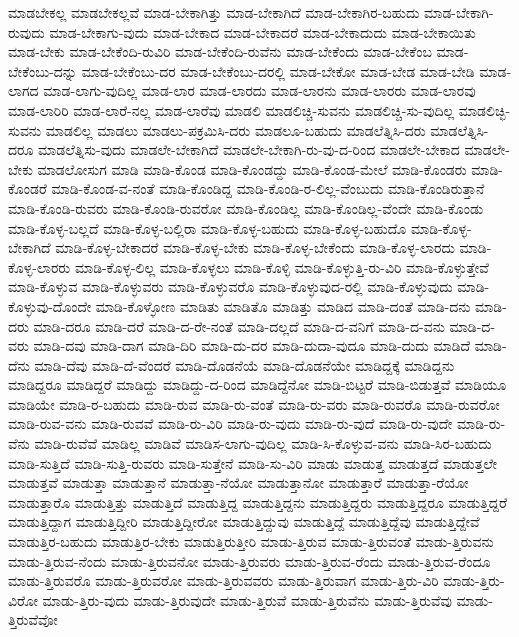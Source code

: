 {ಮಾಡಬೇಕಲ್ಲ
ಮಾಡಬೇಕಲ್ಲವೆ
ಮಾಡ-ಬೇಕಾಗಿತ್ತು
ಮಾಡ-ಬೇಕಾಗಿದೆ
ಮಾಡ-ಬೇಕಾಗಿರ-ಬಹುದು
ಮಾಡ-ಬೇಕಾಗಿ-ರುವುದು
ಮಾಡ-ಬೇಕಾಗು-ವುದು
ಮಾಡ-ಬೇಕಾದ
ಮಾಡ-ಬೇಕಾದರೆ
ಮಾಡ-ಬೇಕಾದುದು
ಮಾಡ-ಬೇಕಾಯಿತು
ಮಾಡ-ಬೇಕು
ಮಾಡ-ಬೇಕೆಂದಿ-ರುವಿರಿ
ಮಾಡ-ಬೇಕೆಂದಿ-ರುವೆನು
ಮಾಡ-ಬೇಕೆಂದು
ಮಾಡ-ಬೇಕೆಂಬ
ಮಾಡ-ಬೇಕೆಂಬು-ದನ್ನು
ಮಾಡ-ಬೇಕೆಂಬು-ದರ
ಮಾಡ-ಬೇಕೆಂಬು-ದರಲ್ಲಿ
ಮಾಡ-ಬೇಕೋ
ಮಾಡ-ಬೇಡ
ಮಾಡ-ಬೇಡಿ
ಮಾಡ-ಲಾಗದ
ಮಾಡ-ಲಾಗು-ವುದಿಲ್ಲ
ಮಾಡ-ಲಾರ
ಮಾಡ-ಲಾರದು
ಮಾಡ-ಲಾರನು
ಮಾಡ-ಲಾರರು
ಮಾಡ-ಲಾರವು
ಮಾಡ-ಲಾರಿರಿ
ಮಾಡ-ಲಾರೆ-ನಲ್ಲ
ಮಾಡ-ಲಾರೆವು
ಮಾಡಲಿ
ಮಾಡಲಿಚ್ಚಿ-ಸುವನು
ಮಾಡಲಿಚ್ಚಿ-ಸು-ವುದಿಲ್ಲ
ಮಾಡಲಿಚ್ಛಿ-ಸುವನು
ಮಾಡಲಿಲ್ಲ
ಮಾಡಲು
ಮಾಡಲು-ಪಕ್ರಮಿಸಿ-ದರು
ಮಾಡಲೂ-ಬಹುದು
ಮಾಡಲೆತ್ನಿಸಿ-ದರು
ಮಾಡಲೆತ್ನಿಸಿ-ದರೂ
ಮಾಡಲೆತ್ನಿಸು-ವುದು
ಮಾಡಲೇ-ಬೇಕಾಗಿದೆ
ಮಾಡಲೇ-ಬೇಕಾಗಿ-ರು-ವು-ದ-ರಿಂದ
ಮಾಡಲೇ-ಬೇಕಾದ
ಮಾಡಲೇ-ಬೇಕು
ಮಾಡಲೋಸುಗ
ಮಾಡಿ
ಮಾಡಿ-ಕೊಂಡ
ಮಾಡಿ-ಕೊಂಡದ್ದು
ಮಾಡಿ-ಕೊಂಡ-ಮೇಲೆ
ಮಾಡಿ-ಕೊಂಡರು
ಮಾಡಿ-ಕೊಂಡರೆ
ಮಾಡಿ-ಕೊಂಡ-ವ-ನಂತೆ
ಮಾಡಿ-ಕೊಂಡಿದ್ದ
ಮಾಡಿ-ಕೊಂಡಿ-ರ-ಲಿಲ್ಲ-ವೆಂಬುದು
ಮಾಡಿ-ಕೊಂಡಿರುತ್ತಾನೆ
ಮಾಡಿ-ಕೊಂಡಿ-ರುವರು
ಮಾಡಿ-ಕೊಂಡಿ-ರುವರೋ
ಮಾಡಿ-ಕೊಂಡಿಲ್ಲ
ಮಾಡಿ-ಕೊಂಡಿಲ್ಲ-ವೆಂದೇ
ಮಾಡಿ-ಕೊಂಡು
ಮಾಡಿ-ಕೊಳ್ಳ-ಬಲ್ಲದೆ
ಮಾಡಿ-ಕೊಳ್ಳ-ಬಲ್ಲಿರಾ
ಮಾಡಿ-ಕೊಳ್ಳ-ಬಹುದು
ಮಾಡಿ-ಕೊಳ್ಳ-ಬಹುದೊ
ಮಾಡಿ-ಕೊಳ್ಳ-ಬೇಕಾಗಿದೆ
ಮಾಡಿ-ಕೊಳ್ಳ-ಬೇಕಾದರೆ
ಮಾಡಿ-ಕೊಳ್ಳ-ಬೇಕು
ಮಾಡಿ-ಕೊಳ್ಳ-ಬೇಕೆಂದು
ಮಾಡಿ-ಕೊಳ್ಳ-ಲಾರದು
ಮಾಡಿ-ಕೊಳ್ಳ-ಲಾರರು
ಮಾಡಿ-ಕೊಳ್ಳ-ಲಿಲ್ಲ
ಮಾಡಿ-ಕೊಳ್ಳಲು
ಮಾಡಿ-ಕೊಳ್ಳಿ
ಮಾಡಿ-ಕೊಳ್ಳುತ್ತಿ-ರು-ವಿರಿ
ಮಾಡಿ-ಕೊಳ್ಳುತ್ತೇವೆ
ಮಾಡಿ-ಕೊಳ್ಳುವ
ಮಾಡಿ-ಕೊಳ್ಳುವರು
ಮಾಡಿ-ಕೊಳ್ಳುವರೊ
ಮಾಡಿ-ಕೊಳ್ಳುವುದ-ರಲ್ಲಿ
ಮಾಡಿ-ಕೊಳ್ಳುವುದು
ಮಾಡಿ-ಕೊಳ್ಳುವು-ದೊಂದೇ
ಮಾಡಿ-ಕೊಳ್ಳೋಣ
ಮಾಡಿತು
ಮಾಡಿತೊ
ಮಾಡಿತ್ತು
ಮಾಡಿದ
ಮಾಡಿ-ದಂತೆ
ಮಾಡಿ-ದನು
ಮಾಡಿ-ದರು
ಮಾಡಿ-ದರೂ
ಮಾಡಿ-ದರೆ
ಮಾಡಿ-ದ-ರೇ-ನಂತೆ
ಮಾಡಿ-ದಲ್ಲದೆ
ಮಾಡಿ-ದ-ವನಿಗೆ
ಮಾಡಿ-ದ-ವನು
ಮಾಡಿ-ದ-ವರು
ಮಾಡಿ-ದವು
ಮಾಡಿ-ದಾಗ
ಮಾಡಿ-ದಿರಿ
ಮಾಡಿ-ದು-ದರ
ಮಾಡಿ-ದುದಾ-ವುದೂ
ಮಾಡಿ-ದುದು
ಮಾಡಿದೆ
ಮಾಡಿ-ದೆನು
ಮಾಡಿ-ದೆವು
ಮಾಡಿ-ದೆ-ವೆಂದರೆ
ಮಾಡಿ-ದೊಡನೆಯೆ
ಮಾಡಿ-ದೊಡನೆಯೇ
ಮಾಡಿದ್ದಕ್ಕೆ
ಮಾಡಿದ್ದನು
ಮಾಡಿದ್ದರೂ
ಮಾಡಿದ್ದರೆ
ಮಾಡಿದ್ದು
ಮಾಡಿದ್ದು-ದ-ರಿಂದ
ಮಾಡಿದ್ದೆನೋ
ಮಾಡಿ-ಬಿಟ್ಟರೆ
ಮಾಡಿ-ಬಿಡುತ್ತವೆ
ಮಾಡಿಯೂ
ಮಾಡಿಯೇ
ಮಾಡಿ-ರ-ಬಹುದು
ಮಾಡಿ-ರುವ
ಮಾಡಿ-ರು-ವಂತೆ
ಮಾಡಿ-ರು-ವರು
ಮಾಡಿ-ರುವರೊ
ಮಾಡಿ-ರುವರೋ
ಮಾಡಿ-ರುವ-ವನು
ಮಾಡಿ-ರುವವೆ
ಮಾಡಿ-ರು-ವಿರಿ
ಮಾಡಿ-ರು-ವುದು
ಮಾಡಿ-ರು-ವುದೆ
ಮಾಡಿ-ರು-ವುದೇ
ಮಾಡಿ-ರು-ವೆನು
ಮಾಡಿ-ರುವೆವೆ
ಮಾಡಿಲ್ಲ
ಮಾಡಿವೆ
ಮಾಡಿಸ-ಲಾಗು-ವುದಿಲ್ಲ
ಮಾಡಿ-ಸಿ-ಕೊಳ್ಳುವ-ವನು
ಮಾಡಿ-ಸಿರ-ಬಹುದು
ಮಾಡಿ-ಸುತ್ತಿದೆ
ಮಾಡಿ-ಸುತ್ತಿ-ರುವರು
ಮಾಡಿ-ಸುತ್ತೇನೆ
ಮಾಡಿ-ಸು-ವಿರಿ
ಮಾಡು
ಮಾಡುತ್ತ
ಮಾಡುತ್ತದೆ
ಮಾಡುತ್ತಲೇ
ಮಾಡುತ್ತವೆ
ಮಾಡುತ್ತಾ
ಮಾಡುತ್ತಾನೆ
ಮಾಡುತ್ತಾ-ನೆಯೋ
ಮಾಡುತ್ತಾನೋ
ಮಾಡುತ್ತಾರೆ
ಮಾಡುತ್ತಾ-ರೆಯೋ
ಮಾಡುತ್ತಾರೊ
ಮಾಡುತ್ತಿತ್ತು
ಮಾಡುತ್ತಿದೆ
ಮಾಡುತ್ತಿದ್ದ
ಮಾಡುತ್ತಿದ್ದನು
ಮಾಡುತ್ತಿದ್ದರು
ಮಾಡುತ್ತಿದ್ದರೂ
ಮಾಡುತ್ತಿದ್ದರೆ
ಮಾಡುತ್ತಿದ್ದಾಗ
ಮಾಡುತ್ತಿದ್ದೀರಿ
ಮಾಡುತ್ತಿದ್ದೀರೋ
ಮಾಡುತ್ತಿದ್ದುವು
ಮಾಡುತ್ತಿದ್ದೆ
ಮಾಡುತ್ತಿದ್ದೆವು
ಮಾಡುತ್ತಿದ್ದೇವೆ
ಮಾಡುತ್ತಿರ-ಬಹುದು
ಮಾಡುತ್ತಿರ-ಬೇಕು
ಮಾಡುತ್ತಿರುತ್ತೀರಿ
ಮಾಡು-ತ್ತಿರುವ
ಮಾಡು-ತ್ತಿರುವಂತೆ
ಮಾಡು-ತ್ತಿರುವನು
ಮಾಡು-ತ್ತಿರುವ-ನೆಂದು
ಮಾಡು-ತ್ತಿರುವನೋ
ಮಾಡು-ತ್ತಿರುವರು
ಮಾಡು-ತ್ತಿರುವ-ರೆಂದು
ಮಾಡು-ತ್ತಿರುವ-ರೆಂದೂ
ಮಾಡು-ತ್ತಿರುವರೊ
ಮಾಡು-ತ್ತಿರುವರೋ
ಮಾಡು-ತ್ತಿರುವವರು
ಮಾಡು-ತ್ತಿರುವಾಗ
ಮಾಡು-ತ್ತಿರು-ವಿರಿ
ಮಾಡು-ತ್ತಿರು-ವಿರೋ
ಮಾಡು-ತ್ತಿರು-ವುದು
ಮಾಡು-ತ್ತಿರುವುದೇ
ಮಾಡು-ತ್ತಿರುವೆ
ಮಾಡು-ತ್ತಿರುವೆನು
ಮಾಡು-ತ್ತಿರುವೆವು
ಮಾಡು-ತ್ತಿರುವೆವೋ
}
